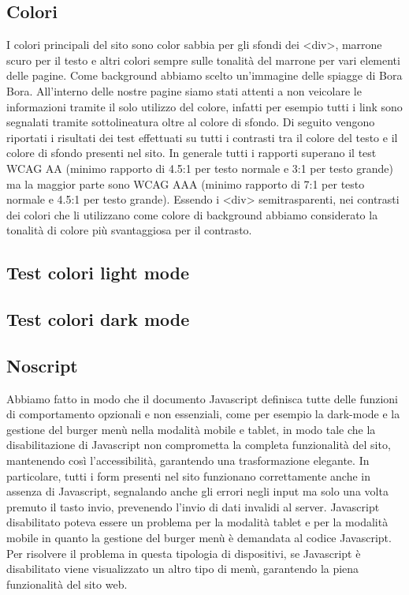 \documentclass[a4paper]{article}
\begin{document}
	\subsection{Colori}
	I colori principali del sito sono color sabbia per gli sfondi dei <div>, marrone scuro per il testo e altri colori sempre sulle tonalità del marrone per vari elementi delle pagine. Come background abbiamo scelto un'immagine delle spiagge di Bora Bora. All'interno delle nostre pagine siamo stati attenti a non veicolare le informazioni tramite il solo utilizzo del colore, infatti per esempio tutti i link sono segnalati tramite sottolineatura oltre al colore di sfondo. Di seguito vengono riportati i risultati dei test effettuati su tutti i contrasti tra il colore del testo e il colore di sfondo presenti nel sito. In generale tutti i rapporti superano il test WCAG AA (minimo rapporto di 4.5:1 per testo normale e 3:1 per testo grande) ma la maggior parte sono WCAG AAA (minimo rapporto di 7:1 per testo normale e 4.5:1 per testo grande). Essendo i <div> semitrasparenti, nei contrasti dei colori che li utilizzano come colore di background abbiamo considerato la tonalità di colore più svantaggiosa per il contrasto.

	\subsection{Test colori light mode}

	\subsection{Test colori dark mode}

	\subsection{Noscript}
	Abbiamo fatto in modo che il documento Javascript definisca tutte delle funzioni di comportamento opzionali e non essenziali, come per esempio la dark-mode e la gestione del burger menù nella modalità mobile e tablet, in modo tale che la disabilitazione di Javascript non comprometta la completa funzionalità del sito, mantenendo così l'accessibilità, garantendo una trasformazione elegante. In particolare, tutti i form presenti nel sito funzionano correttamente anche in assenza di Javascript, segnalando anche gli errori negli input ma solo una volta premuto il tasto invio, prevenendo l'invio di dati invalidi al server. Javascript disabilitato poteva essere un problema per la modalità tablet e per la modalità mobile in quanto la gestione del burger menù è demandata al codice Javascript. Per risolvere il problema in questa tipologia di dispositivi, se Javascript è disabilitato viene visualizzato un altro tipo di menù, garantendo la piena funzionalità del sito web.
\end{document}
